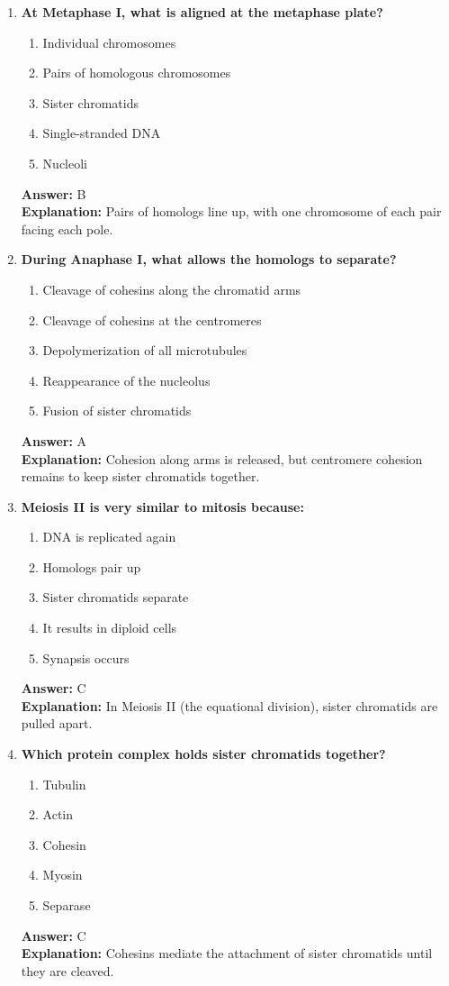 \documentclass[11pt, a4paper]{article}
\begin{document}
\begin{enumerate}[leftmargin=*, label=\arabic*.]
\item \textbf{At Metaphase I, what is aligned at the metaphase plate?}
\begin{enumerate}[label=\Alph*.]
\item Individual chromosomes
\item Pairs of homologous chromosomes
\item Sister chromatids
\item Single-stranded DNA
\item Nucleoli
\end{enumerate}
\textbf{Answer:} B \\
\textbf{Explanation:} Pairs of homologs line up, with one chromosome of each pair facing each pole.

\item \textbf{During Anaphase I, what allows the homologs to separate?}
\begin{enumerate}[label=\Alph*.]
\item Cleavage of cohesins along the chromatid arms
\item Cleavage of cohesins at the centromeres
\item Depolymerization of all microtubules
\item Reappearance of the nucleolus
\item Fusion of sister chromatids
\end{enumerate}
\textbf{Answer:} A \\
\textbf{Explanation:} Cohesion along arms is released, but centromere cohesion remains to keep sister chromatids together.

\item \textbf{Meiosis II is very similar to mitosis because:}
\begin{enumerate}[label=\Alph*.]
\item DNA is replicated again
\item Homologs pair up
\item Sister chromatids separate
\item It results in diploid cells
\item Synapsis occurs
\end{enumerate}
\textbf{Answer:} C \\
\textbf{Explanation:} In Meiosis II (the equational division), sister chromatids are pulled apart.

\item \textbf{Which protein complex holds sister chromatids together?}
\begin{enumerate}[label=\Alph*.]
\item Tubulin
\item Actin
\item Cohesin
\item Myosin
\item Separase
\end{enumerate}
\textbf{Answer:} C \\
\textbf{Explanation:} Cohesins mediate the attachment of sister chromatids until they are cleaved.


\end{enumerate}
\end{document}
